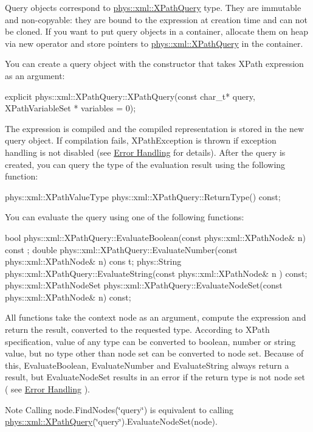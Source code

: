 Query objects correspond to \hyperlink{classphys_1_1xml_1_1XPathQuery}{phys::xml::XPathQuery} type. They are immutable and non-\/copyable: they are bound to the expression at creation time and can not be cloned. If you want to put query objects in a container, allocate them on heap via new operator and store pointers to \hyperlink{classphys_1_1xml_1_1XPathQuery}{phys::xml::XPathQuery} in the container. \par
 \par
 You can create a query object with the constructor that takes XPath expression as an argument: 
\begin{DoxyCode}
 explicit phys::xml::XPathQuery::XPathQuery(const char_t* query, XPathVariableSet
      * variables = 0);
\end{DoxyCode}
 The expression is compiled and the compiled representation is stored in the new query object. If compilation fails, XPathException is thrown if exception handling is not disabled (see \hyperlink{XMLManual_XMLXPathError}{Error Handling} for details). After the query is created, you can query the type of the evaluation result using the following function: 
\begin{DoxyCode}
 phys::xml::XPathValueType phys::xml::XPathQuery::ReturnType() const;
\end{DoxyCode}
 You can evaluate the query using one of the following functions: 
\begin{DoxyCode}
 bool phys::xml::XPathQuery::EvaluateBoolean(const phys::xml::XPathNode& n) const
      ;
 double phys::xml::XPathQuery::EvaluateNumber(const phys::xml::XPathNode& n) cons
      t;
 phys::String phys::xml::XPathQuery::EvaluateString(const phys::xml::XPathNode& n
      ) const;
 phys::xml::XPathNodeSet phys::xml::XPathQuery::EvaluateNodeSet(const 
      phys::xml::XPathNode& n) const;
\end{DoxyCode}
 All functions take the context node as an argument, compute the expression and return the result, converted to the requested type. According to XPath specification, value of any type can be converted to boolean, number or string value, but no type other than node set can be converted to node set. Because of this, EvaluateBoolean, EvaluateNumber and EvaluateString always return a result, but EvaluateNodeSet results in an error if the return type is not node set ( see \hyperlink{XMLManual_XMLXPathError}{Error Handling} ). \begin{DoxyNote}{Note}
Calling node.FindNodes(\char`\"{}query\char`\"{}) is equivalent to calling \hyperlink{classphys_1_1xml_1_1XPathQuery}{phys::xml::XPathQuery}(\char`\"{}query\char`\"{}).EvaluateNodeSet(node).
\end{DoxyNote}
